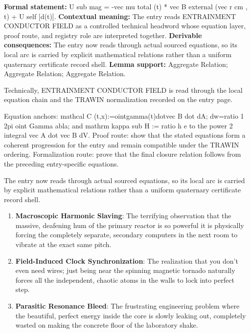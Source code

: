 \begingroup\footnotesize\setlength{\emergencystretch}{3em}\sloppy
\textbf{Formal statement:} U sub mag = -vec mu total (t) * vec B external (vec r cm , t) + U self [d(t)]. \textbf{Contextual meaning:} The entry reads ENTRAINMENT CONDUCTOR FIELD as a controlled technical headword whose equation layer, proof route, and registry role are interpreted together. \textbf{Derivable consequences:} The entry now reads through actual sourced equations, so its local arc is carried by explicit mathematical relations rather than a uniform quaternary certificate record shell. \textbf{Lemma support:} Aggregate Relation; Aggregate Relation; Aggregate Relation.\par
\endgroup

Technically, ENTRAINMENT CONDUCTOR FIELD is read through the local equation chain and the TRAWIN normalization recorded on the entry page.

Equation anchors: mathcal C (t,x):=ointgamma(t)dotvec B dot dA; dw=ratio 1 2pi oint Gamma abla; and mathrm kappa sub H := ratio h e to the power 2 integral vec A dot vec B dV. Proof route: show that the stated equations form a coherent progression for the entry and remain compatible under the TRAWIN ordering. Formalization route: prove that the final closure relation follows from the preceding entry-specific equations.

The entry now reads through actual sourced equations, so its local arc is carried by explicit mathematical relations rather than a uniform quaternary certificate record shell.
\endgroup

\begin{enumerate}[leftmargin=1.6em,itemsep=6pt,topsep=4pt]
\item \textbf{Macroscopic Harmonic Slaving}: The terrifying observation that the massive, deafening hum of the primary reactor is so powerful it is physically forcing the completely separate, secondary computers in the next room to vibrate at the exact same pitch.
\item \textbf{Field-Induced Clock Synchronization}: The realization that you don't even need wires; just being near the spinning magnetic tornado naturally forces all the independent, chaotic atoms in the walls to lock into perfect step.
\item \textbf{Parasitic Resonance Bleed}: The frustrating engineering problem where the beautiful, perfect energy inside the core is slowly leaking out, completely wasted on making the concrete floor of the laboratory shake.
\end{enumerate}

